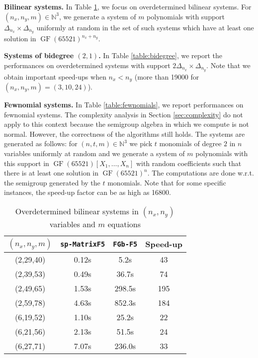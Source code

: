 \documentclass[12pt]{article}
\numberwithin{equation}{section}
\numberwithin{theorem}{section}
\DeclareMathOperator{\GF}{GF}
\newcommand{\N}{\mathbb{N}}
\begin{document}
{\bf Bilinear systems.} In Table \ref{table:bilinear}, we focus on overdetermined bilinear
systems. For $(n_x,n_y,m)\in\N^3$, we generate a system of $m$ polynomials
with support $\Delta_{n_x}\times\Delta_{n_y}$ uniformly at random in
the set of such systems which have at least one solution in
$\GF(65521)^{n_x+n_y}$.

{\bf Systems of bidegree $(2,1)$.} In Table \ref{table:bidegree}, we
report the performances on overdetermined systems with support $2\Delta_{n_x}\times\Delta_{n_y}$. Note that we obtain important speed-ups when
$n_x<n_y$ (more than 19000 for $(n_x,n_y,m)=(3,10,24)$).

{\bf Fewnomial systems.} In Table \ref{table:fewnomials}, we report
performances on fewnomial systems. The complexity analysis in
Section \ref{sec:complexity} do not apply to this context because the
semigroup algebra in which we compute is not normal. However, the correctness of the algorithms still holds. The
systems are generated as follows: for $(n,t,m)\in\N^3$ we pick $t$
monomials of degree $2$ in $n$ variables uniformly at random and we
generate a system of $m$ polynomials with this support in
$\GF(65521)[X_1,\ldots, X_n]$ with random coefficients such that there
is at least one solution in $\GF(65521)^n$. The computations are done
w.r.t. the semigroup generated by the $t$ monomials. Note that for
some specific instances, the speed-up factor can be as high as 16800.


\begin{table}
  \centering
  \begin{tabular}{|c||c|c||c|}
\hline
$(n_x,n_y,m)$ & {\tt sp-MatrixF5} & {\tt FGb-F5} & Speed-up\\
\hline
\hline
(2,29,40) & 0.12s & 5.2s & 43 \\

(2,39,53) & 0.49s & 36.7s & 74 \\

(2,49,65) & 1.53s & 298.5s & 195\\

(2,59,78) & 4.63s & 852.3s & 184 \\

(6,19,52) & 1.10s & 25.2s & 22 \\

(6,21,56) & 2.13s & 51.5s & 24 \\

(6,27,71) & 7.07s & 236.0s & 33 \\
\hline
  \end{tabular}
  \caption{Overdetermined bilinear systems in $(n_x,n_y)$ variables and $m$ equations}\label{table:bilinear}
\end{table}
\end{document}
